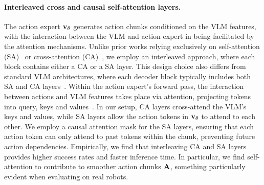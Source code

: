\paragraph{Interleaved cross and causal self-attention layers.}
The action expert \( \mathbf{v}_\theta \) generates action chunks conditioned on the VLM features, with the interaction between the VLM and action expert in \ours being facilitated by the attention mechanisms.
Unlike prior works relying exclusively on self-attention (SA)~\citep{black2024pi_0} or cross-attention (CA)~\citep{bjorck2025gr00t}, we employ an interleaved approach, where each block contains either a CA or a SA layer. 
This design choice also differs from standard VLM architectures, where each decoder block typically includes both SA and CA layers~\citep{OBELICS,alayrac2022flamingo,chen2022pali}. 
Within the action expert's forward pass, the interaction between actions and VLM features takes place via attention, projecting tokens into query, keys and values~\citep{vaswani2017attention}. 
In our setup, CA layers cross-attend the VLM's keys and values, while SA layers allow the action tokens in \( \mathbf{v}_\theta \) to attend to each other.
We employ a causal attention mask for the SA layers, ensuring that each action token can only attend to past tokens within the chunk, preventing future action dependencies. Empirically, we find that interleaving CA and SA layers provides higher success rates and faster inference time. In particular, we find self-attention to contribute to smoother action chunks \( \mathbf{A} \), something particularly evident when evaluating on real robots.






